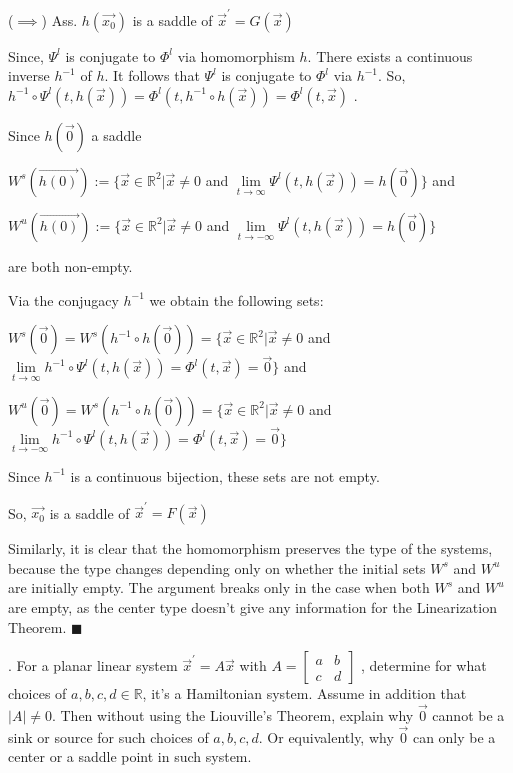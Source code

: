 \documentclass{article}
\begin{document}
($\implies$) Ass. $h(\vec{x_0})$ is a saddle of $\vec{x}^\prime = G(\vec{x})$

Since, $\Psi^l$ is conjugate to $\Phi^l$ via homomorphism $h$. There
exists a continuous inverse $h^{-1}$ of $h$. It follows
that $\Psi^l$ is conjugate to $\Phi^l$ via $h^{-1}$. So, $h^{-1}\circ
\Psi^l(t,h(\vec{x})) = \Phi^l(t,h^{-1}\circ h(\vec{x})) = \Phi^l(t,\vec{x})$ .

Since $h(\vec{0})$ a saddle

$W^s(\vec{h(0)}) := \{\vec{x}\in \mathbb{R}^2| \vec{x} \neq
0$ and $\lim\limits_{t\rightarrow \infty} \Psi^l(t,h(\vec{x})) = h(\vec{0})\}$
and

$W^u(\vec{h(0)}) := \{\vec{x}\in \mathbb{R}^2| \vec{x} \neq
0$ and $\lim\limits_{t\rightarrow -\infty}  \Psi^l(t,h(\vec{x}))
= h(\vec{0})\}$


are both non-empty.

Via the conjugacy $h^{-1}$ we obtain the following sets:

$W^s(\vec{0}) = W^s(h^{-1}\circ h(\vec{0})) = \{\vec{x}\in \mathbb{R}^2| \vec{x} \neq
0$ and $\lim\limits_{t\rightarrow \infty} h^{-1}\circ
\Psi^l(t,h(\vec{x})) = \Phi^l(t, \vec{x}) = \vec{0}\}$
and

$W^u(\vec{0}) = W^s(h^{-1}\circ h(\vec{0})) = \{\vec{x}\in \mathbb{R}^2| \vec{x} \neq
0$ and $\lim\limits_{t\rightarrow -\infty} h^{-1}\circ
\Psi^l(t,h(\vec{x})) = \Phi^l(t, \vec{x}) = \vec{0}\}$

Since $h^{-1}$ is a continuous bijection, these sets are not
empty.

So, $\vec{x_0}$ is a saddle of $\vec{x}^\prime = F(\vec{x})$

Similarly, it is clear that the homomorphism preserves the type of the
systems, because the type changes depending only on whether the
initial sets $W^s$ and $W^u$ are initially empty. The argument breaks
only in the case when both $W^s$ and $W^u$ are empty, as the center
type doesn't give any information for the Linearization Theorem.
\vspace{0.618 em}
$\blacksquare$


. For a planar linear system $\vec{x}^\prime = A\vec{x}$ with $A = \begin{bmatrix}
a& b\\
c& d \end{bmatrix}$
, determine for what choices
of $a, b, c, d ∈ \mathbb{R}$, it’s a Hamiltonian system. Assume in addition that $|A| \neq 0$. Then
without using the Liouville’s Theorem, explain why $\vec{0}$ cannot be a sink or source
for such choices of $a, b, c, d$. Or equivalently, why $\vec{0}$ can only be a center or a saddle
point in such system.
\end{document}

